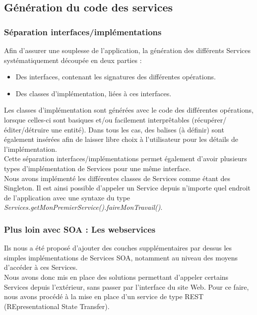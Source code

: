 
\subsection{Génération du code des services}

\subsubsection{Séparation interfaces/implémentations}

Afin d'assurer une souplesse de l'application, la génération des différents Services systématiquement découpée en deux parties :
\begin{itemize}
\item Des interfaces, contenant les signatures des différentes opérations.
\item Des classes d'implémentation, liées à ces interfaces.
\end{itemize}	

Les classes d'implémentation sont générées avec le code des différentes opérations, lorsque celles-ci sont basiques et/ou facilement interprêtables (récupérer/éditer/détruire une entité). Dans tous les cas, des balises  (à définir) sont également insérées afin de laisser libre choix à l'utilisateur pour les détails de l'implémentation.\\
Cette séparation interfaces/implémentations permet également d'avoir plusieurs types d'implémentation de Services pour une même interface.\\
Nous avons implémenté les différentes classes de Services comme étant des Singleton. Il est ainsi possible d'appeler un Service depuis n'importe quel endroit de l'application avec une syntaxe du type \textit{Services.getMonPremierService().faireMonTravail()}.

\subsubsection{Plus loin avec SOA : Les webservices}

Ils nous a été proposé d'ajouter des couches supplémentaires par dessus les simples implémentations de Services SOA, notamment au niveau des moyens d'accéder à ces Services.\\
Nous avons donc mis en place des solutions permettant d'appeler certains Services depuis l'extérieur, sans passer par l'interface du site Web. Pour ce faire, nous avons procédé à la mise en place d'un service de type REST (REpresentational State Transfer).

